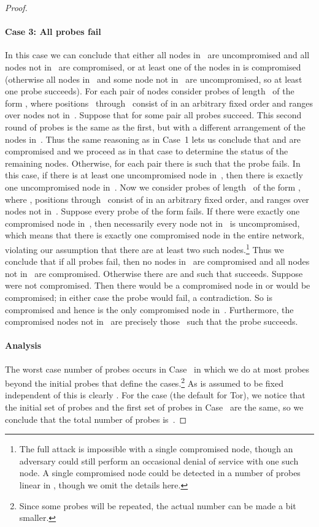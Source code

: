 \documentclass[]{lmcs}
\begin{document}
\begin{proof}
\paragraph*{Case 3: All  probes fail}
In this case we can conclude that either
all nodes in~ are uncompromised and all nodes not in~ are compromised,
or at least one
of the nodes in  is compromised (otherwise all nodes in~ and some node
not in~
are uncompromised, so at least one probe succeeds).
For each pair of nodes  consider
probes of length~ of the form , where positions~
through~ consist of  in an arbitrary fixed order
and  ranges over nodes not in~.
Suppose that for some pair  all
probes succeed.  
This second round of probes is the same as the first, but with
a different arrangement of the nodes in~.  Thus the same reasoning
as in Case~1 lets us conclude that  and  are compromised
and we proceed as in that case to determine the status of the remaining
nodes.
Otherwise, for each pair  there is 
such that the probe  fails.  In this
case, if there is at least one uncompromised node in~, then
there is exactly one uncompromised node in~.  Now we consider
probes of length~ of the form , where ,
positions  through~ consist of 
in an arbitrary fixed order, and  ranges over nodes not in~.
Suppose every probe of the form  fails.  If there were
exactly one compromised node in~, then necessarily every node not in~
is uncompromised, which means that there is exactly one compromised node in the
entire network, violating our assumption that there are at least two
such nodes.\footnote{The full attack is impossible with a single 
compromised node,
though an adversary could still perform an occasional denial of
service with one such node.  A single compromised node could be
detected in a number of probes linear in , though we omit the
details here.}  
Thus we conclude that if all probes  fail, then
no nodes in~ are compromised and all nodes
not in~ are compromised.
Otherwise there are  and  such that 
succeeds.  Suppose  were not compromised.  Then there would be a
compromised node in  or  would be compromised;
in either case the probe  would fail, a contradiction.
So  is compromised and hence  is the only compromised node in~.
Furthermore, the compromised nodes not in~ are precisely those~
such that the probe  succeeds.

\paragraph*{Analysis}
The worst case number of probes occurs in Case~ in which we do at most
 probes beyond the initial 
probes that define the cases.\footnote{Since some probes will be repeated,
the actual number can be made a bit smaller.}
As  is assumed to be fixed independent of
 this is clearly . For the case  (the default for Tor), 
we notice that the initial set of probes and the first set of
probes in Case~ are the same, so 
we conclude that the total number of probes is~.
\end{proof}
\end{document}

